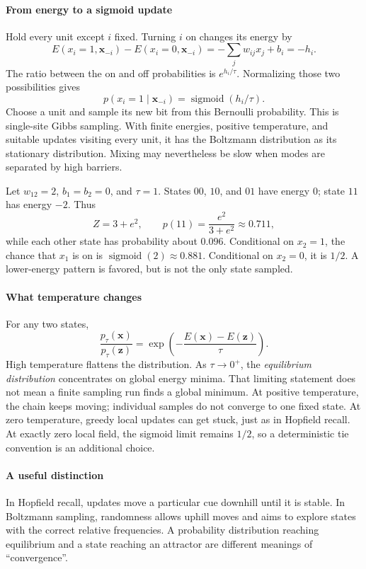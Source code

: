 \documentclass[11pt, oneside]{book}
\begin{document}
\paragraph{From energy to a sigmoid update} Hold every unit except $i$ fixed. Turning $i$ on changes its energy by
\[
 E(x_i=1,\mathbf{x}_{-i})-E(x_i=0,\mathbf{x}_{-i})
 =-\sum_jw_{ij}x_j+b_i=-h_i.
\]
The ratio between the on and off probabilities is $e^{h_i/\tau}$. Normalizing those two possibilities gives
\[
 p(x_i=1\mid\mathbf{x}_{-i})=\operatorname{sigmoid}(h_i/\tau).
\]
Choose a unit and sample its new bit from this Bernoulli probability. This is single-site Gibbs sampling. With finite energies, positive temperature, and suitable updates visiting every unit, it has the Boltzmann distribution as its stationary distribution. Mixing may nevertheless be slow when modes are separated by high barriers.

\begin{exbox}[title={A complete two-bit distribution}]
Let $w_{12}=2$, $b_1=b_2=0$, and $\tau=1$. States $00$, $10$, and $01$ have energy $0$; state $11$ has energy $-2$. Thus
\[
 Z=3+e^2,\qquad p(11)=\frac{e^2}{3+e^2}\approx0.711,
\]
while each other state has probability about $0.096$. Conditional on $x_2=1$, the chance that $x_1$ is on is $\operatorname{sigmoid}(2)\approx0.881$. Conditional on $x_2=0$, it is $1/2$. A lower-energy pattern is favored, but is not the only state sampled.
\end{exbox}

\paragraph{What temperature changes} For any two states,
\[
 \frac{p_\tau(\mathbf{x})}{p_\tau(\mathbf{z})}
 =\exp\!\left(-\frac{E(\mathbf{x})-E(\mathbf{z})}{\tau}\right).
\]
High temperature flattens the distribution. As $\tau\to0^+$, the \emph{equilibrium distribution} concentrates on global energy minima. That limiting statement does not mean a finite sampling run finds a global minimum. At positive temperature, the chain keeps moving; individual samples do not converge to one fixed state. At zero temperature, greedy local updates can get stuck, just as in Hopfield recall. At exactly zero local field, the sigmoid limit remains $1/2$, so a deterministic tie convention is an additional choice.

\paragraph{A useful distinction} In Hopfield recall, updates move a particular cue downhill until it is stable. In Boltzmann sampling, randomness allows uphill moves and aims to explore states with the correct relative frequencies. A probability distribution reaching equilibrium and a state reaching an attractor are different meanings of ``convergence''.
\end{document}

